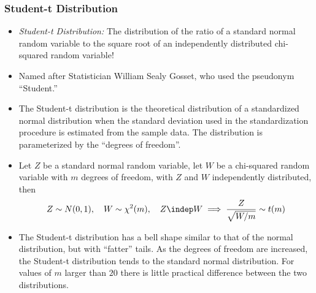 

\begin{frame}
\frametitle{Student-t Distribution}
\begin{itemize}
\item \emph{Student-t Distribution:} The distribution of the ratio of a standard normal random variable to the square root of an independently distributed chi-squared random variable!
\item Named after Statistician William Sealy Gosset, who used the pseudonym ``Student.''
\item The Student-t distribution is the theoretical distribution of a standardized normal distribution when the standard deviation used in the standardization procedure is estimated from the sample data. The distribution is parameterized by the ``degrees of freedom''. 
\item Let $Z$ be a standard normal random variable, let $W$ be a chi-squared random variable with $m$ degrees of freedom, with $Z$ and $W$ independently distributed, then
\begin{align*}
Z \sim N(0, 1), 
\quad
W \sim \chi^2 (m), 
\quad
Z \indep W
\implies
\frac{Z}{\sqrt{W/m}} \sim t(m)
\end{align*}
\item The Student-t distribution has a bell shape similar to that of the normal distribution, but with ``fatter'' tails. As the degrees of freedom are increased, the Student-t distribution tends to the standard normal distribution. For values of $m$ larger than $20$ there is little practical difference between the two distributions. 
\end{itemize}
\end{frame}


